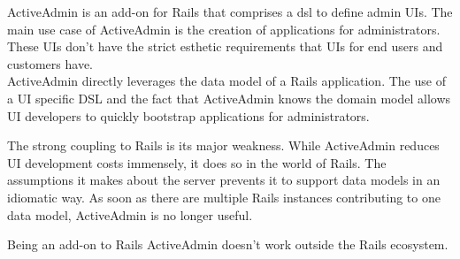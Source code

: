 ActiveAdmin is an add-on for Rails that comprises a \gls{dsl} to define admin UIs. The main use case of ActiveAdmin is the creation of applications for administrators. These UIs don't have the strict esthetic requirements that UIs for end users and customers have. \\
ActiveAdmin directly leverages the data model of a Rails application. The use of a UI specific DSL and the fact that ActiveAdmin knows the domain model allows UI developers to quickly bootstrap applications for administrators.

The strong coupling to Rails is its major weakness. While ActiveAdmin reduces UI development costs immensely, it does so in the world of Rails. The assumptions it makes about the server prevents it to support data models in an idiomatic way. As soon as there are multiple Rails instances contributing to one data model, ActiveAdmin is no longer useful.

Being an add-on to Rails ActiveAdmin doesn't work outside the Rails ecosystem.
